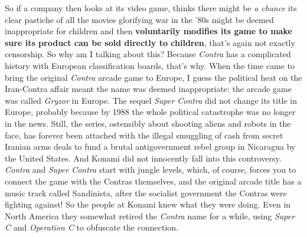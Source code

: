 \documentclass{book}
\let\oldcenter\center
\let\oldendcenter\endcenter
\renewenvironment{center}{\setlength\topsep{0pt}\oldcenter}{\oldendcenter}
\begin{document}
\begin{center}
\vspace{8pt}
\quad\vspace{4pt}
\quad\vspace{4pt}
\end{center}

So if a company then looks at its video game, thinks there might be \emph{a chance} its clear pastiche of all the movies glorifying war in the ’80s might be deemed inappropriate for children and then \textbf{voluntarily modifies its game to make sure its product can be sold directly to children}, that’s again not exactly censorship. So why am I talking about this? Because \emph{Contra} has a complicated history with European classification boards, that’s why. When the time came to bring the original \emph{Contra} arcade game to Europe, I guess the political heat on the Iran-Contra affair meant the name was deemed inappropriate: the arcade game was called \emph{Gryzor} in Europe. The sequel \emph{Super Contra} did not change its title in Europe, probably because by 1988 the whole political catastrophe was no longer in the news. Still, the series, ostensibly about shooting aliens and robots in the face, has forever been attached with the illegal smuggling of cash from secret Iranian arms deals to fund a brutal antigovernment rebel group in Nicaragua by the United States. And Konami did not innocently fall into this controversy. \emph{Contra} and \emph{Super Contra} start with jungle levels, which, of course, forces you to connect the game with the Contras themselves, and the original arcade title has a music track called Sandinista, after the socialist government the Contras were fighting against! So the people at Konami knew what they were doing. Even in North America they somewhat retired the \emph{Contra} name for a while, using \emph{Super C} and \emph{Operation C} to obfuscate the connection.
\end{document}
